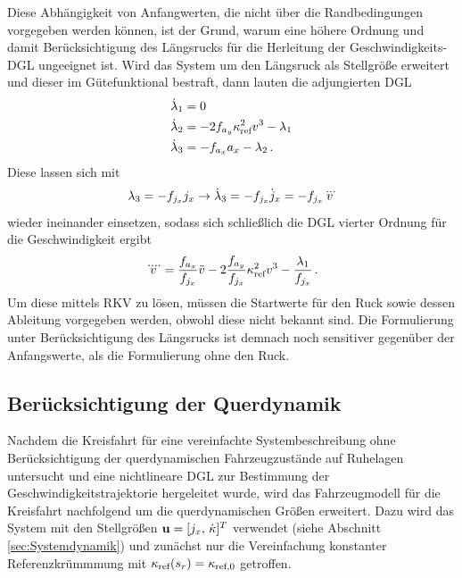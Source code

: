 Diese Abhängigkeit von Anfangwerten, die nicht über die Randbedingungen vorgegeben werden können, ist der Grund, warum eine höhere Ordnung und damit Berücksichtigung des Längsrucks für die Herleitung der Geschwindigkeits-\gls{DGL} ungeeignet ist. Wird das System um den Längsruck als Stellgröße erweitert und dieser im Gütefunktional bestraft, dann lauten die adjungierten \gls{DGL}
\begin{align}
\dot{\lambda}_1 &= 0 \\
\dot{\lambda}_2 &= -2f_{a_y} \kappa_{\textrm{ref}}^2v^3 - \lambda_1 \\
\dot{\lambda}_3 &= -f_{a_x} a_x - \lambda_2\,.
\end{align}
Diese lassen sich mit 
\begin{equation}
\lambda_3 = -f_{j_x} j_x \rightarrow \dot{\lambda}_3 = -f_{j_x} \dot{j}_x = -f_{j_x} \dddot{v}
\end{equation}
wieder ineinander einsetzen, sodass sich schließlich die \gls{DGL} vierter Ordnung für die Geschwindigkeit ergibt
\begin{equation}
\ddddot{v} = \frac{f_{a_x}}{f_{j_x}}\ddot{v} - 2\frac{f_{a_y}}{f_{j_x}}\kappa_{\textrm{ref}}^2v^3 - \frac{\lambda_1}{f_{j_x}}\,. \label{eq:DGL_v_Kreisfahrt_vierte_ordnung}
\end{equation}
Um diese mittels \gls{RKV} zu lösen, müssen die Startwerte für den Ruck sowie dessen Ableitung vorgegeben werden, obwohl diese nicht bekannt sind. Die Formulierung unter Berücksichtigung des Längsrucks ist demnach noch sensitiver gegenüber der Anfangswerte, als die Formulierung ohne den Ruck.

\subsection{Berücksichtigung der Querdynamik}
Nachdem die Kreisfahrt für eine vereinfachte Systembeschreibung ohne Berücksichtigung der querdynamischen Fahrzeugzustände auf Ruhelagen untersucht und eine nichtlineare \gls{DGL} zur Bestimmung der Geschwindigkeitstrajektorie hergeleitet wurde, wird das Fahrzeugmodell für die Kreisfahrt nachfolgend um die querdynamischen Größen erweitert. Dazu wird das System mit den Stellgrößen $\boldsymbol{\mathrm{u}} = [j_x,\,\dot{\kappa}]^T$ verwendet (siehe Abschnitt \ref{sec:Systemdynamik}) und zunächst nur die Vereinfachung konstanter Referenzkrümmmung mit $\kappa_{\textrm{ref}}(s_r)=\kappa_{\textrm{ref},0}$ getroffen. 

